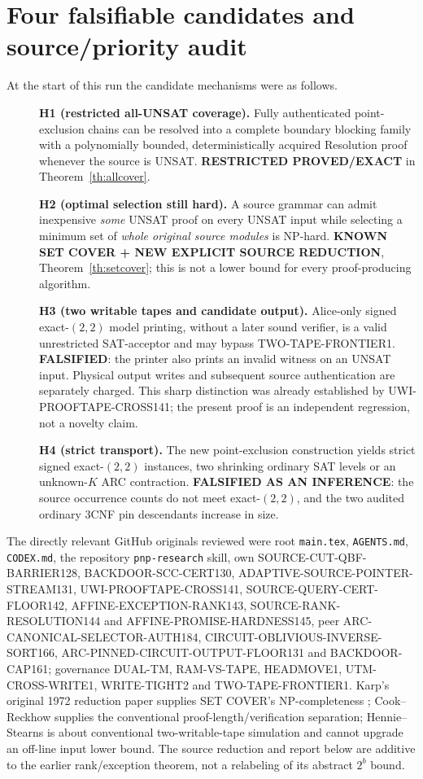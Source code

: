 \section{Four falsifiable candidates and source/priority audit}
At the start of this run the candidate mechanisms were as follows.
\begin{description}
\item[] \textbf{H1 (restricted all-UNSAT coverage).} Fully authenticated point-exclusion chains can be resolved into a complete boundary blocking family with a polynomially bounded, deterministically acquired Resolution proof whenever the source is UNSAT. \textbf{RESTRICTED PROVED/EXACT} in Theorem~\ref{th:allcover}.
\item[] \textbf{H2 (optimal selection still hard).} A source grammar can admit inexpensive \emph{some} UNSAT proof on every UNSAT input while selecting a minimum set of \emph{whole original source modules} is NP-hard. \textbf{KNOWN SET COVER + NEW EXPLICIT SOURCE REDUCTION}, Theorem~\ref{th:setcover}; this is not a lower bound for every proof-producing algorithm.
\item[] \textbf{H3 (two writable tapes and candidate output).} Alice-only signed exact-$(2,2)$ model printing, without a later sound verifier, is a valid unrestricted SAT-acceptor and may bypass TWO-TAPE-FRONTIER1. \textbf{FALSIFIED}: the printer also prints an invalid witness on an UNSAT input. Physical output writes and subsequent source authentication are separately charged. This sharp distinction was already established by UWI-PROOFTAPE-CROSS141; the present proof is an independent regression, not a novelty claim.
\item[] \textbf{H4 (strict transport).} The new point-exclusion construction yields strict signed exact-$(2,2)$ instances, two shrinking ordinary SAT levels or an unknown-$K$ ARC contraction. \textbf{FALSIFIED AS AN INFERENCE}: the source occurrence counts do not meet exact-$(2,2)$, and the two audited ordinary 3CNF pin descendants increase in size.
\end{description}
The directly relevant GitHub originals reviewed were root \texttt{main.tex}, \texttt{AGENTS.md}, \texttt{CODEX.md}, the repository \texttt{pnp-research} skill, own SOURCE-CUT-QBF-BARRIER128, BACKDOOR-SCC-CERT130, ADAPTIVE-SOURCE-POINTER-STREAM131, UWI-PROOFTAPE-CROSS141, SOURCE-QUERY-CERT-FLOOR142, AFFINE-EXCEPTION-RANK143, SOURCE-RANK-RESOLUTION144 and AFFINE-PROMISE-HARDNESS145, peer ARC-CANONICAL-SELECTOR-AUTH184, CIRCUIT-OBLIVIOUS-INVERSE-SORT166, ARC-PINNED-CIRCUIT-OUTPUT-FLOOR131 and BACKDOOR-CAP161; governance DUAL-TM, RAM-VS-TAPE, HEADMOVE1, UTM-CROSS-WRITE1, WRITE-TIGHT2 and TWO-TAPE-FRONTIER1. Karp's original 1972 reduction paper supplies SET COVER's NP-completeness \cite{karp}; Cook--Reckhow \cite{cr} supplies the conventional proof-length/verification separation; Hennie--Stearns \cite{hs} is about conventional two-writable-tape simulation and cannot upgrade an off-line input lower bound. The source reduction and report below are additive to the earlier rank/exception theorem, not a relabeling of its abstract $2^b$ bound.

